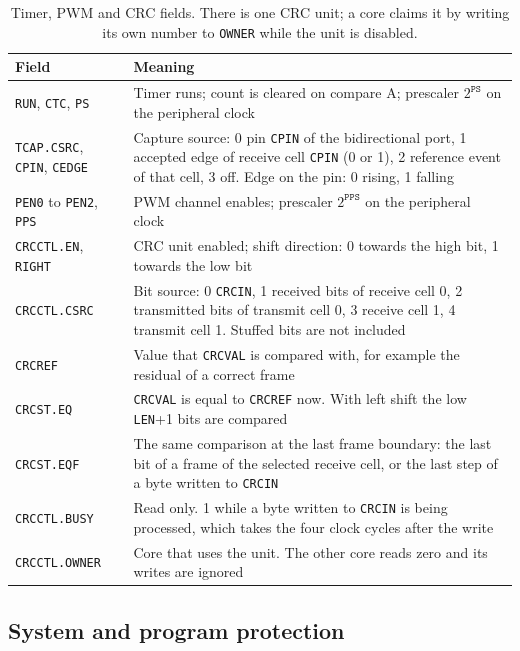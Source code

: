 \documentclass[10pt,a4paper]{article}
\newcommand{\reg}[1]{\texttt{#1}}
\begin{document}
\begin{table}[H]
\centering\small
\begin{tabularx}{\linewidth}{@{}lL@{}}
\toprule
Field & Meaning \\
\midrule
\reg{RUN}, \reg{CTC}, \reg{PS} & Timer runs; count is cleared on compare A; prescaler $2^{\mathtt{PS}}$ on the peripheral clock \\
\reg{TCAP.CSRC}, \reg{CPIN}, \reg{CEDGE} & Capture source: 0 pin \reg{CPIN} of the bidirectional port, 1 accepted edge of receive cell \reg{CPIN} (0 or 1), 2 reference event of that cell, 3 off. Edge on the pin: 0 rising, 1 falling \\
\reg{PEN0} to \reg{PEN2}, \reg{PPS} & PWM channel enables; prescaler $2^{\mathtt{PPS}}$ on the peripheral clock \\
\reg{CRCCTL.EN}, \reg{RIGHT} & CRC unit enabled; shift direction: 0 towards the high bit, 1 towards the low bit \\
\reg{CRCCTL.CSRC} & Bit source: 0 \reg{CRCIN}, 1 received bits of receive cell 0, 2 transmitted bits of transmit cell 0, 3 receive cell 1, 4 transmit cell 1. Stuffed bits are not included \\
\reg{CRCREF} & Value that \reg{CRCVAL} is compared with, for example the residual of a correct frame \\
\reg{CRCST.EQ} & \reg{CRCVAL} is equal to \reg{CRCREF} now. With left shift the low \reg{LEN}+1 bits are compared \\
\reg{CRCST.EQF} & The same comparison at the last frame boundary: the last bit of a frame of the selected receive cell, or the last step of a byte written to \reg{CRCIN} \\
\reg{CRCCTL.BUSY} & Read only. 1 while a byte written to \reg{CRCIN} is being processed, which takes the four clock cycles after the write \\
\reg{CRCCTL.OWNER} & Core that uses the unit. The other core reads zero and its writes are ignored \\
\bottomrule
\end{tabularx}
\caption{Timer, PWM and CRC fields. There is one CRC unit; a core claims it by writing its own number to \reg{OWNER} while the unit is disabled.}
\end{table}

\subsection{System and program protection}
\end{document}
